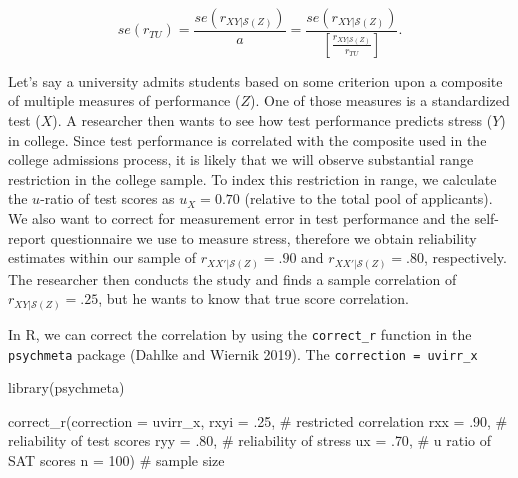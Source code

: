 \documentclass[
  letterpaper,
  DIV=11,
  numbers=noendperiod]{scrreprt}
\newenvironment{Shaded}{}{}
\newcommand{\AttributeTok}[1]{\textcolor[rgb]{0.00,0.34,0.68}{#1}}
\newcommand{\CommentTok}[1]{\textcolor[rgb]{0.54,0.53,0.53}{#1}}
\newcommand{\DecValTok}[1]{\textcolor[rgb]{0.69,0.50,0.00}{#1}}
\newcommand{\FunctionTok}[1]{\textcolor[rgb]{0.39,0.29,0.61}{#1}}
\newcommand{\NormalTok}[1]{\textcolor[rgb]{0.12,0.11,0.11}{#1}}
\newcommand{\StringTok}[1]{\textcolor[rgb]{0.75,0.01,0.01}{#1}}
\begin{document}
\[
se(r_{TU}) = \frac{se\left(r_{XY|\mathcal{S}(Z)}\right)}{\hat{a}}= \frac{se\left(r_{XY|\mathcal{S}(Z)}\right)}{\left[\frac{r_{XY|\mathcal{S}(Z)}}{r_{TU}}\right]}.
\]

\begin{tcolorbox}[enhanced jigsaw, toptitle=1mm, titlerule=0mm, arc=.35mm, breakable, colframe=quarto-callout-note-color-frame, title={Applied Example in R}, opacitybacktitle=0.6, opacityback=0, colbacktitle=quarto-callout-note-color!10!white, coltitle=black, bottomtitle=1mm, colback=white, bottomrule=.15mm, rightrule=.15mm, toprule=.15mm, leftrule=.75mm, left=2mm]

Let's say a university admits students based on some criterion upon a
composite of multiple measures of performance (\(Z\)). One of those
measures is a standardized test (\(X\)). A researcher then wants to see
how test performance predicts stress (\(Y\)) in college. Since test
performance is correlated with the composite used in the college
admissions process, it is likely that we will observe substantial range
restriction in the college sample. To index this restriction in range,
we calculate the \(u\)-ratio of test scores as \(u_{X}=0.70\) (relative
to the total pool of applicants). We also want to correct for
measurement error in test performance and the self-report questionnaire
we use to measure stress, therefore we obtain reliability estimates
within our sample of \(r_{XX'|\mathcal{S}(Z)}=.90\) and
\(r_{XX'|\mathcal{S}(Z)}=.80\), respectively. The researcher then
conducts the study and finds a sample correlation of
\(r_{XY|\mathcal{S}(Z)}=.25\), but he wants to know that true score
correlation.

In R, we can correct the correlation by using the \texttt{correct\_r}
function in the \texttt{psychmeta} package (Dahlke and Wiernik 2019).
The \texttt{correction\ =\ \textquotesingle{}uvirr\_x\textquotesingle{}}

\begin{Shaded}
\begin{Highlighting}[]
\FunctionTok{library}\NormalTok{(psychmeta)}

\FunctionTok{correct\_r}\NormalTok{(}\AttributeTok{correction =} \StringTok{\textquotesingle{}uvirr\_x\textquotesingle{}}\NormalTok{,}
          \AttributeTok{rxyi =}\NormalTok{ .}\DecValTok{25}\NormalTok{,  }\CommentTok{\# restricted correlation}
          \AttributeTok{rxx =}\NormalTok{ .}\DecValTok{90}\NormalTok{,  }\CommentTok{\# reliability of test scores}
          \AttributeTok{ryy =}\NormalTok{ .}\DecValTok{80}\NormalTok{,  }\CommentTok{\# reliability of stress}
          \AttributeTok{ux =}\NormalTok{ .}\DecValTok{70}\NormalTok{,   }\CommentTok{\# u ratio of SAT scores}
          \AttributeTok{n =} \DecValTok{100}\NormalTok{)    }\CommentTok{\# sample size}
\end{Highlighting}
\end{Shaded}


\end{tcolorbox}
\end{document}
